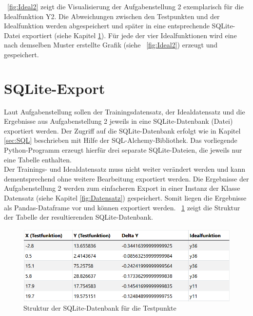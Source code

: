 \documentclass[11pt,a4paper]{scrreprt}
\newcommand{\abbildung}[1]{\figurename\ \ref{#1}}
\begin{document}
\abbildung{fig:Ideal2} zeigt die Visualisierung der Aufgabenstellung 2 exemplarisch für die Idealfunktion Y2. Die Abweichungen zwischen den Testpunkten und der Idealfunktion werden abgespeichert und später in eine entsprechende SQLite-Datei exportiert (siehe Kapitel \ref{sec:sqlite}). Für jede der vier Idealfunktionen wird eine nach demselben Muster erstellte Grafik (siehe \abbildung{fig:Ideal2}) erzeugt und gespeichert. 

\section{SQLite-Export}
\label{sec:sqlite}
Laut Aufgabenstellung sollen der Trainingsdatensatz, der Idealdatensatz und die Ergebnisse aus Aufgabenstellung 2 jeweils in eine SQLite-Datenbank (Datei) exportiert werden. Der Zugriff auf die SQLite-Datenbank erfolgt wie in Kapitel \ref{sec:SQL} beschrieben  mit Hilfe der SQL-Alchemy-Bibliothek. Das vorliegende Python-Programm erzeugt hierfür drei separate SQLite-Dateien, die jeweils nur eine Tabelle enthalten. \\
Der Trainings- und Idealdatensatz muss nicht weiter verändert werden und kann dementsprechend ohne weitere Bearbeitung exportiert werden. Die Ergebnisse der Aufgabenstellung 2 werden zum einfacheren Export in einer Instanz der Klasse Datensatz (siehe Kapitel \ref{fig:Datensatz}) gespeichert. Somit liegen die Ergebnisse als Pandas-Dataframe vor und können exportiert werden. \abbildung{fig:DBTestpunkte} zeigt die Struktur der Tabelle der resultierenden SQLite-Datenbank. 
\begin{figure}[!h]
	\centering
	\includegraphics[scale=0.9]{Datenbank_2}
	\caption{Struktur der SQLite-Datenbank für die Testpunkte}
	\label{fig:DBTestpunkte}
\end{figure}
\end{document}
